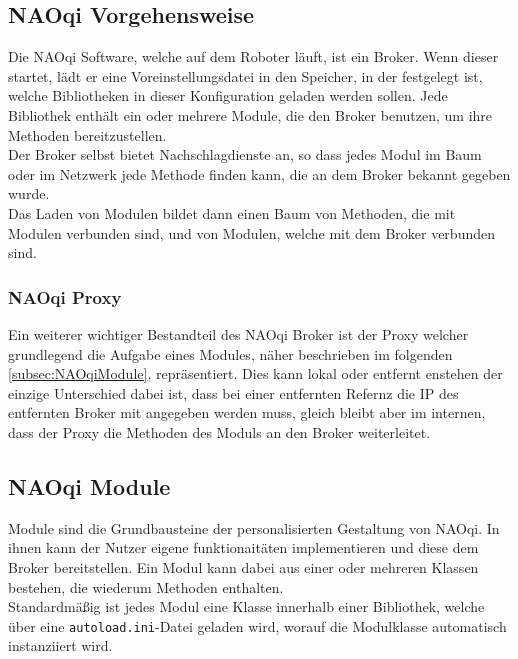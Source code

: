 \subsection{NAOqi Vorgehensweise}\label{subsec:NAOqiVorgehensweise}
Die NAOqi Software, welche auf dem Roboter läuft, ist ein Broker. Wenn dieser startet, lädt er eine Voreinstellungsdatei in den Speicher, in der festgelegt ist, welche Bibliotheken in dieser Konfiguration geladen werden sollen. Jede Bibliothek enthält ein oder mehrere Module, die den Broker benutzen, um ihre Methoden bereitzustellen.\\
\noindent
Der Broker selbst bietet Nachschlagdienste an, so dass jedes Modul im Baum oder im Netzwerk jede Methode finden kann, die an dem Broker bekannt gegeben wurde.\\
Das Laden von Modulen bildet dann einen Baum von Methoden, die mit Modulen verbunden sind, und von Modulen, welche mit dem Broker verbunden sind.\\

\subsubsection{NAOqi Proxy}\label{subsubsec:NAOqiProxy}
Ein weiterer wichtiger Bestandteil des NAOqi Broker ist der Proxy welcher grundlegend die Aufgabe eines Modules, näher beschrieben im folgenden \autoref{subsec:NAOqiModule}, repräsentiert. Dies kann lokal oder entfernt enstehen der einzige Unterschied dabei ist, dass bei einer entfernten Refernz die \ac{IP} des entfernten Broker mit angegeben werden muss, gleich bleibt aber im internen, dass der Proxy die Methoden des Moduls an den Broker weiterleitet.\\

\subsection{NAOqi Module}\label{subsec:NAOqiModule}
Module sind die Grundbausteine der personalisierten Gestaltung von NAOqi. In ihnen kann der Nutzer eigene funktionaitäten implementieren und diese dem Broker bereitstellen. Ein Modul kann dabei aus einer oder mehreren Klassen bestehen, die wiederum Methoden enthalten.
\\

\noindent
Standardmäßig ist jedes Modul eine Klasse innerhalb einer Bibliothek, welche über eine \texttt{autoload.ini}-Datei geladen wird, worauf die Modulklasse automatisch instanziiert wird.
\\

